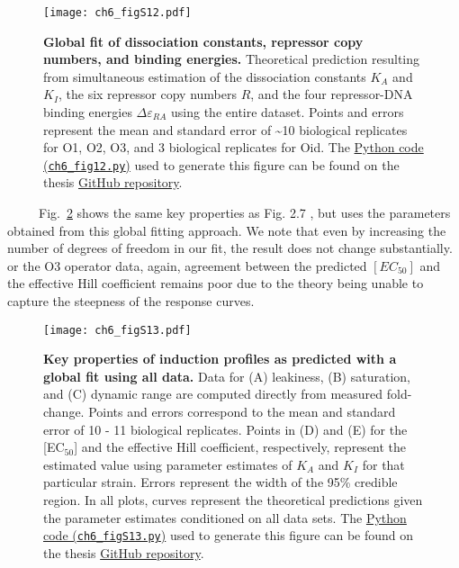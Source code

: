 \documentclass[12pt]{caltech_thesis}
\begin{document}
\hypertarget{fig:induction_global_fit}{%
\begin{figure}
\centering
\texttt{[image: ch6\_figS12.pdf]}
\caption[{Induction curves using global parameter
estimates.}]{\textbf{Global fit of dissociation constants, repressor
copy numbers, and binding energies.} Theoretical prediction resulting
from simultaneous estimation of the dissociation constants \(K_A\) and
\(K_I\), the six repressor copy numbers \(R\), and the four
repressor-DNA binding energies \(\Delta\varepsilon_{RA}\) using the
entire dataset. Points and errors represent the mean and standard error
of \textasciitilde10 biological replicates for O1, O2, O3, and 3
biological replicates for Oid. The
\href{https://github.com/gchure/phd/blob/master/src/chapter_06/code/ch6_figS12.py}{Python
code (\texttt{ch6\_fig12.py})} used to generate this figure can be found
on the thesis \href{https://github.com/gchure/phd}{GitHub repository}.}
\label{fig:induction_global_fit}
\end{figure}
}

~~~~~Fig.~\ref{fig:properties_global_fit} shows the same key properties
as Fig. 2.7 , but uses the parameters obtained from this global fitting
approach. We note that even by increasing the number of degrees of
freedom in our fit, the result does not change substantially. or the O3
operator data, again, agreement between the predicted \([EC_{50}]\) and
the effective Hill coefficient remains poor due to the theory being
unable to capture the steepness of the response curves.

\hypertarget{fig:properties_global_fit}{%
\begin{figure}
\centering
\texttt{[image: ch6\_figS13.pdf]}
\caption[{Key properties of induction profiles as predicted with a
global fit using all data.}]{\textbf{Key properties of induction
profiles as predicted with a global fit using all data.} Data for (A)
leakiness, (B) saturation, and (C) dynamic range are computed directly
from measured fold-change. Points and errors correspond to the mean and
standard error of 10 - 11 biological replicates. Points in (D) and (E)
for the {[}EC\(_{50}\){]} and the effective Hill coefficient,
respectively, represent the estimated value using parameter estimates of
\(K_A\) and \(K_I\) for that particular strain. Errors represent the
width of the 95\% credible region. In all plots, curves represent the
theoretical predictions given the parameter estimates conditioned on all
data sets. The
\href{https://github.com/gchure/phd/blob/master/src/chapter_06/code/ch6_figS13.py}{Python
code (\texttt{ch6\_figS13.py})} used to generate this figure can be
found on the thesis \href{https://github.com/gchure/phd}{GitHub
repository}.}
\label{fig:properties_global_fit}
\end{figure}
}
\end{document}
